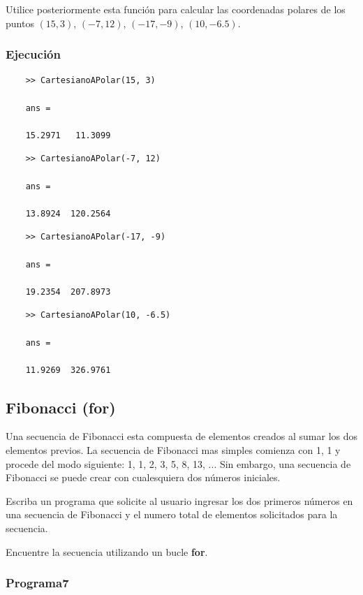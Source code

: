 \documentclass{article}
\begin{document}
	Utilice posteriormente esta función para calcular las coordenadas polares de los puntos $(15, 3)$, $(-7, 12)$, $(-17, -9)$, $(10, -6.5)$.\\
	
	\subsubsection{Ejecución}
	
	\begin{lstlisting}
	>> CartesianoAPolar(15, 3)
	
	ans =
	
	15.2971   11.3099
	\end{lstlisting}
	
	\begin{lstlisting}
	>> CartesianoAPolar(-7, 12)
	
	ans =
	
	13.8924  120.2564
	\end{lstlisting}
	
	\begin{lstlisting}
	>> CartesianoAPolar(-17, -9)
	
	ans =
	
	19.2354  207.8973
	\end{lstlisting}
	
	\begin{lstlisting}
	>> CartesianoAPolar(10, -6.5)
	
	ans =
	
	11.9269  326.9761
	\end{lstlisting}
	
	\newpage
	
	\subsection{Fibonacci (for)}
	Una secuencia de Fibonacci esta compuesta de elementos creados al sumar los dos elementos previos. La secuencia de Fibonacci mas simples comienza con 1, 1 y procede del modo siguiente: 1, 1, 2, 3, 5, 8, 13, ... Sin embargo, una secuencia de Fibonacci se puede crear con cualesquiera dos números iniciales.
	
	Escriba un programa que solicite al usuario ingresar los dos primeros números en una secuencia de Fibonacci y el numero total de elementos solicitados para la secuencia.
	
	Encuentre la secuencia utilizando un bucle \textbf{for}.
	
	\subsubsection{Programa7}
	
\end{document}
